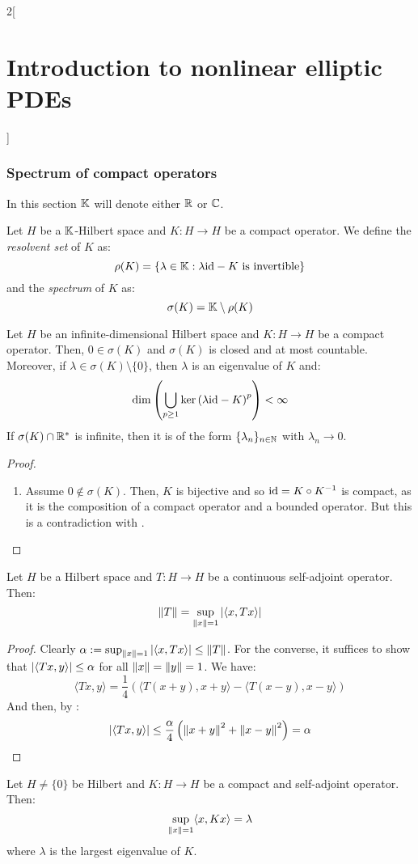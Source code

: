 \documentclass[../../../main_math.tex]{subfiles}
\begin{document}
\begin{multicols}{2}[\section{Introduction to nonlinear elliptic PDEs}]
  \subsubsection{Spectrum of compact operators}
  In this section $\mathbb{K}$ will denote either $\mathbb{R}$ or $\mathbb{C}$.
  \begin{definition}
    Let $H$ be a $\mathbb{K}$-Hilbert space and $K:H\to H$ be a compact operator. We define the \emph{resolvent set} of $K$ as:
    $$
      \rho(K)=\{\lambda\in \mathbb{K}: \lambda\mathrm{id}-K \text{ is invertible}\}
    $$
    and the \emph{spectrum} of $K$ as:
    $$
      \sigma(K)=\mathbb{K}\setminus \rho(K)
    $$
  \end{definition}
  \begin{theorem}
    Let $H$ be an infinite-dimensional Hilbert space and $K:H\to H$ be a compact operator. Then, $0\in \sigma(K)$ and $\sigma(K)$ is closed and at most countable. Moreover, if $\lambda\in \sigma(K)\setminus\{0\}$, then $\lambda$ is an eigenvalue of $K$ and:
    $$
      \dim\left(\bigcup_{p\geq 1}\ker{(\lambda\mathrm{id}-K)}^p\right)<\infty
    $$
    If $\sigma(K)\cap\mathbb{R}^*$ is infinite, then it is of the form $\{\lambda_n\}_{n\in \mathbb{N}}$ with $\lambda_n\to 0$.
  \end{theorem}
  \begin{proof}
    \begin{enumerate}
      \item Assume $0\notin \sigma(K)$. Then, $K$ is bijective and so $\mathrm{id} = K\circ K^{-1}$ is compact, as it is the composition of a compact operator and a bounded operator. But this is a contradiction with .
    \end{enumerate}
  \end{proof}
  \begin{lemma}
    Let $H$ be a Hilbert space and $T:H\to H$ be a continuous self-adjoint operator. Then:
    $$
      \left\|T\right\|=\sup_{\left\|x\right\|=1}\abs{\langle x,Tx\rangle}
    $$
  \end{lemma}
  \begin{proof}
    Clearly $\alpha:=\sup_{\left\|x\right\|=1}\abs{\langle x,Tx\rangle}\leq \left\|T\right\|$. For the converse, it suffices to show that $\abs{\langle Tx,y\rangle}\leq \alpha$ for all $\left\|x\right\|=\left\|y\right\|=1$. We have:
    $$
      \langle Tx,y\rangle = \frac{1}{4}\left(\langle T(x+y),x+y\rangle-\langle T(x-y),x-y\rangle\right)
    $$
    And then, by :
    $$
      \abs{\langle Tx,y\rangle}\leq \frac{\alpha}{4}\left(\left\|x+y\right\|^2+\left\|x-y\right\|^2\right)= \alpha
    $$
  \end{proof}
  \begin{lemma}
    Let $H\ne\{ 0\}$ be Hilbert and $K:H\to H$ be a compact and self-adjoint operator. Then:
    $$
      \sup_{\left\|x\right\|=1}\langle x,Kx\rangle=\lambda
    $$
    where $\lambda$ is the largest eigenvalue of $K$.
  \end{lemma}

\end{multicols}
\end{document}
